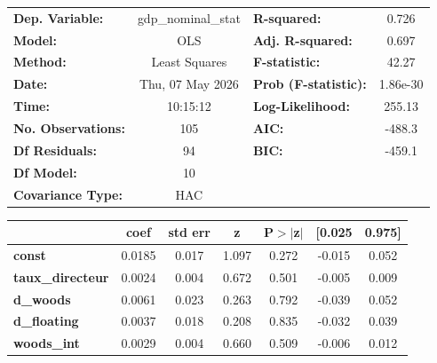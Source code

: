 \begin{center}
\begin{tabular}{lclc}
\toprule
\textbf{Dep. Variable:}         & gdp\_nominal\_stat & \textbf{  R-squared:         } &     0.726   \\
\textbf{Model:}                 &        OLS         & \textbf{  Adj. R-squared:    } &     0.697   \\
\textbf{Method:}                &   Least Squares    & \textbf{  F-statistic:       } &     42.27   \\
\textbf{Date:}                  &  Thu, 07 May 2026  & \textbf{  Prob (F-statistic):} &  1.86e-30   \\
\textbf{Time:}                  &      10:15:12      & \textbf{  Log-Likelihood:    } &    255.13   \\
\textbf{No. Observations:}      &          105       & \textbf{  AIC:               } &    -488.3   \\
\textbf{Df Residuals:}          &           94       & \textbf{  BIC:               } &    -459.1   \\
\textbf{Df Model:}              &           10       & \textbf{                     } &             \\
\textbf{Covariance Type:}       &        HAC         & \textbf{                     } &             \\
\bottomrule
\end{tabular}
\begin{tabular}{lcccccc}
                                & \textbf{coef} & \textbf{std err} & \textbf{z} & \textbf{P$> |$z$|$} & \textbf{[0.025} & \textbf{0.975]}  \\
\midrule
\textbf{const}                  &       0.0185  &        0.017     &     1.097  &         0.272        &       -0.015    &        0.052     \\
\textbf{taux\_directeur}        &       0.0024  &        0.004     &     0.672  &         0.501        &       -0.005    &        0.009     \\
\textbf{d\_woods}               &       0.0061  &        0.023     &     0.263  &         0.792        &       -0.039    &        0.052     \\
\textbf{d\_floating}            &       0.0037  &        0.018     &     0.208  &         0.835        &       -0.032    &        0.039     \\
\textbf{woods\_int}             &       0.0029  &        0.004     &     0.660  &         0.509        &       -0.006    &        0.012     \\

\end{tabular}
\end{center}
